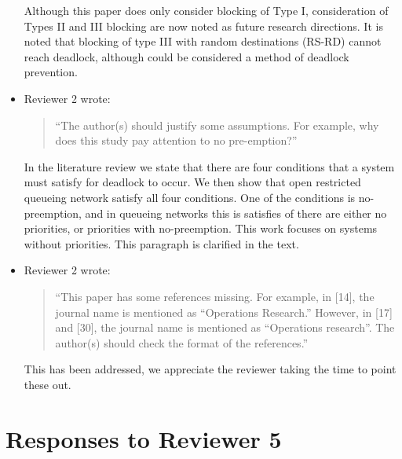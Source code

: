 \documentclass{article}
\begin{document}
\begin{itemize}
Although this paper does only consider blocking of Type I, consideration of
Types II and III blocking are now noted as future research directions.
It is noted that blocking of type III with random destinations (RS-RD) cannot
reach deadlock, although could be considered a method of deadlock prevention.

\item Reviewer 2 wrote:
\begin{quote}
``The author(s) should justify some assumptions.
For example, why does this study pay attention to no pre-emption?''
\end{quote}

In the literature review we state that there are four conditions that a system
must satisfy for deadlock to occur.
We then show that open restricted queueing network satisfy all four conditions.
One of the conditions is no-preemption, and in queueing networks this is
satisfies of there are either no priorities, or priorities with no-preemption.
This work focuses on systems without priorities.
This paragraph is clarified in the text.

\item Reviewer 2 wrote:
\begin{quote}
``This paper has some references missing.
For example, in [14], the journal name is mentioned as “Operations Research.”
However, in [17] and [30], the journal name is mentioned as “Operations
research”. The author(s) should check the format of the references.''
\end{quote}

This has been addressed, we appreciate the reviewer taking the time to point
these out.

\end{itemize}



\section*{Responses to Reviewer 5}
\end{document}
